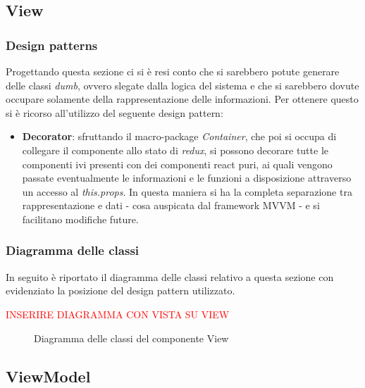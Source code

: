 	\subsection{View}
		\subsubsection{Design patterns}
		Progettando questa sezione ci si è resi conto che si sarebbero potute generare delle classi \emph{dumb}, ovvero slegate dalla logica del sistema e che si sarebbero dovute occupare solamente della rappresentazione delle informazioni. Per ottenere questo si è ricorso all'utilizzo del seguente design pattern:
			\begin{itemize}
				\item \textbf{Decorator}: sfruttando il macro-package \emph{Container}, che poi si occupa di collegare il componente allo stato di \emph{redux}, si possono decorare tutte le componenti ivi presenti con dei componenti react puri, ai quali vengono passate eventualmente le informazioni e le funzioni a disposizione attraverso un accesso al \emph{this.props}. In questa maniera si ha la completa separazione tra rappresentazione e dati - cosa auspicata dal framework MVVM - e si facilitano modifiche future.
			\end{itemize}
		
		\subsubsection{Diagramma delle classi}
		In seguito è riportato il diagramma delle classi relativo a questa sezione con evidenziato la posizione del design pattern utilizzato.
	
	{\textcolor{red}{INSERIRE DIAGRAMMA CON VISTA SU VIEW}}
	\begin{figure}[h]
		\centering
		\caption{Diagramma delle classi del componente View}
		\label{}
	\end{figure}
	
	\subsection{ViewModel}
